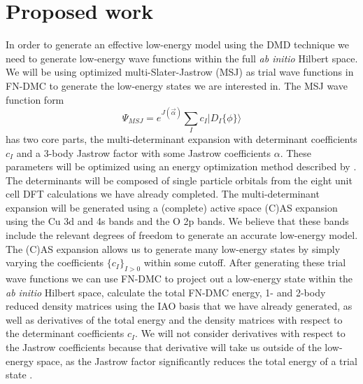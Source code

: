 \documentclass{article}
\begin{document}
\section{Proposed work}
In order to generate an effective low-energy model using the DMD technique we need to generate low-energy wave functions within the full \textit{ab initio} Hilbert space. 
We will be using optimized multi-Slater-Jastrow (MSJ) as trial wave functions in FN-DMC to generate the low-energy states we are interested in. 
The MSJ wave function form 
\begin{equation}
\Psi_{MSJ} = e^{J(\vec{\alpha})} \sum_I c_I |D_I{\{\phi\}}\rangle 
\end{equation}
has two core parts, the multi-determinant expansion with determinant coefficients $c_I$ and a 3-body Jastrow factor with some Jastrow coefficients $\alpha$. 
These parameters will be optimized using an energy optimization method described by \cite{Toulouse2007}. 
The determinants will be composed of single particle orbitals from the eight unit cell DFT calculations we have already completed.	
The multi-determinant expansion will be generated using a (complete) active space (C)AS expansion using the Cu 3d and 4s bands and the O 2p bands. 
We believe that these bands include the relevant degrees of freedom to generate an accurate low-energy model. 
The (C)AS expansion allows us to generate many low-energy states by simply varying the coefficients $\{c_I\}_{I>0}$ within some cutoff. 
After generating these trial wave functions we can use FN-DMC to project out a low-energy state within the \textit{ab initio} Hilbert space, calculate the total FN-DMC energy, 1- and 2-body reduced density matrices using the IAO basis that we have already generated, as well as derivatives of the total energy and the density matrices with respect to the determinant coefficients $c_I$. 
We will not consider derivatives with respect to the Jastrow coefficients because that derivative will take us outside of the low-energy space, as the Jastrow factor significantly reduces the total energy of a trial state \cite{PhysRevLett.75.3870}.
\end{document}
